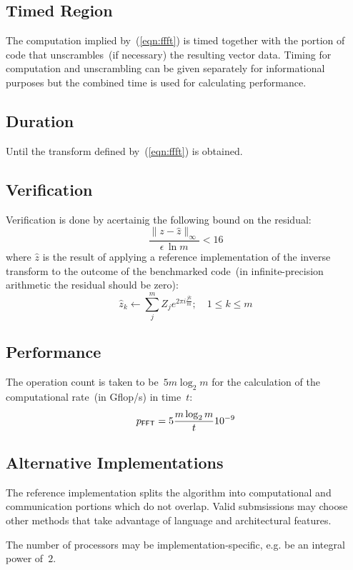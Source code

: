 \documentclass[twocolumn]{article}
\newcommand{\fft}{\textsf{\scriptsize FFT}\xspace}
\begin{document}
\subsection{Timed Region}
The computation implied by~(\ref{eqn:ffft}) is timed together with the portion
of code that unscrambles~(if necessary) the resulting vector data. Timing for
computation and unscrambling can be given separately for informational
purposes but the combined time is used for calculating performance.

\subsection{Duration}
Until the transform defined by~(\ref{eqn:ffft}) is obtained.

\subsection{Verification}
Verification is done by acertainig the following bound on the residual:
\begin{equation}
\frac{\|z-\hat{z}\|_{\infty}}{\epsilon\,\ln m} < 16
\end{equation}
where $\hat{z}$ is the result of applying a reference implementation of the
inverse transform to the outcome of the benchmarked code~(in infinite-precision
arithmetic the residual should be zero):
\begin{equation}
\hat{z}_k\leftarrow\sum_j^m Z_j e^{2\pi i\frac{jk}{m}}; \quad 1 \le k \le m
\end{equation}

\subsection{Performance}
The operation count is taken to be~$5m\log_2 m$ for the calculation of the
computational rate~(in Gflop/s) in time~$t$:
\begin{equation}
  p_{\fft}=5\frac{m\log_2 m}{t}10^{-9}
\end{equation}

\subsection{Alternative Implementations}
The reference implementation splits the algorithm into computational and
communication portions which do not overlap. Valid submsissions may choose other
methods that take advantage of language and architectural features.

The number of processors may be implementation-specific, e.g. be an integral
power of~$2$.
\end{document}
